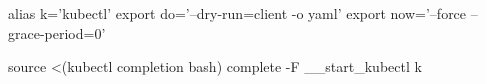 \begin{cheatcodebashbold}
alias k='kubectl'
export do='--dry-run=client -o yaml'
export now='--force --grace-period=0'
\end{cheatcodebashbold}

\begin{cheatcodebash}
source <(kubectl completion bash)
complete -F __start_kubectl k
\end{cheatcodebash}
